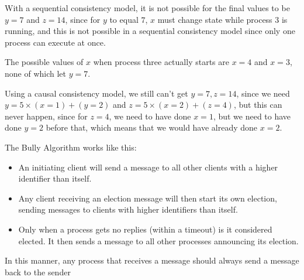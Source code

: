
With a sequential consistency model, it is not possible for the final values to
be $y=7$ and $z=14$, since for $y$ to equal $7$, $x$ must change state while
process $3$ is running, and this is not possible in a sequential consistency
model since only one process can execute at once.

The possible values of $x$ when process three actually starts are $x=4$ and
$x=3$, none of which let $y=7$.


Using a causal consistency model, we still can't get $y=7, z=14$, since we need
$y = 5 \times (x = 1) + (y = 2)$ and $z = 5 \times (x = 2) + (z = 4)$, but this
can never happen, since for $z = 4$, we need to have done $x = 1$, but  we need
to have done $y = 2$ before that, which means that we would have already done $x
= 2$.

\newpage


The Bully Algorithm works like this:

\begin{itemize}
\item An initiating client will send a message to all other clients with a
higher identifier than itself.
\item Any client receiving an election message will then start its own 
election, sending messages to clients with higher identifiers than itself.
\item Only when a process gets no replies (within a timeout) is it considered
elected. It then sends a message to all other processes announcing its election.
\end{itemize}

In this manner, any process that receives a message should always send a message
back to the sender


